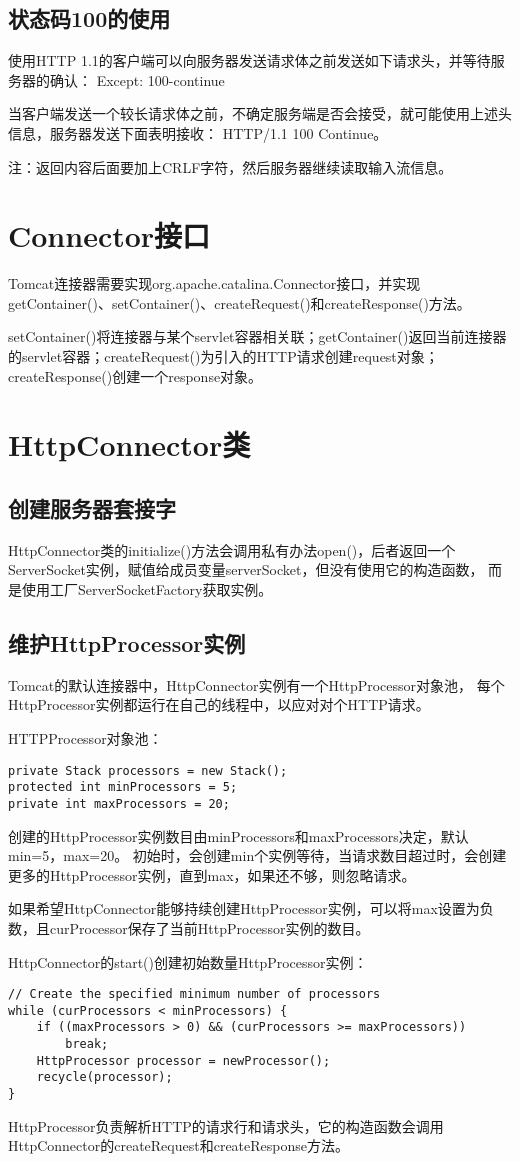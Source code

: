 \subsection{状态码100的使用}
使用HTTP 1.1的客户端可以向服务器发送请求体之前发送如下请求头，并等待服务器的确认：
Except: 100-continue
\par 当客户端发送一个较长请求体之前，不确定服务端是否会接受，就可能使用上述头信息，服务器发送下面表明接收：
HTTP/1.1 100 Continue。
\par 注：返回内容后面要加上CRLF字符，然后服务器继续读取输入流信息。

\section{Connector接口}
Tomcat连接器需要实现org.apache.catalina.Connector接口，并实现
getContainer()、setContainer()、createRequest()和createResponse()方法。
\par setContainer()将连接器与某个servlet容器相关联；getContainer()返回当前连接器的servlet容器；createRequest()为引入的HTTP请求创建request对象；createResponse()创建一个response对象。
\section{HttpConnector类}
\subsection{创建服务器套接字}
HttpConnector类的initialize()方法会调用私有办法open()，后者返回一个
ServerSocket实例，赋值给成员变量serverSocket，但没有使用它的构造函数，
而是使用工厂ServerSocketFactory获取实例。
\subsection{维护HttpProcessor实例}
Tomcat的默认连接器中，HttpConnector实例有一个HttpProcessor对象池，
每个HttpProcessor实例都运行在自己的线程中，以应对对个HTTP请求。
\par HTTPProcessor对象池：
\begin{lstlisting}
private Stack processors = new Stack();
protected int minProcessors = 5;
private int maxProcessors = 20;
\end{lstlisting}
\par 创建的HttpProcessor实例数目由minProcessors和maxProcessors决定，默认min=5，max=20。
初始时，会创建min个实例等待，当请求数目超过时，会创建更多的HttpProcessor实例，直到max，如果还不够，则忽略请求。
\par 如果希望HttpConnector能够持续创建HttpProcessor实例，可以将max设置为负数，且curProcessor保存了当前HttpProcessor实例的数目。
\par HttpConnector的start()创建初始数量HttpProcessor实例：
\begin{lstlisting}
// Create the specified minimum number of processors
while (curProcessors < minProcessors) {
	if ((maxProcessors > 0) && (curProcessors >= maxProcessors))
		break;
	HttpProcessor processor = newProcessor();
	recycle(processor);
}
\end{lstlisting}
\par HttpProcessor负责解析HTTP的请求行和请求头，它的构造函数会调用HttpConnector的createRequest和createResponse方法。
